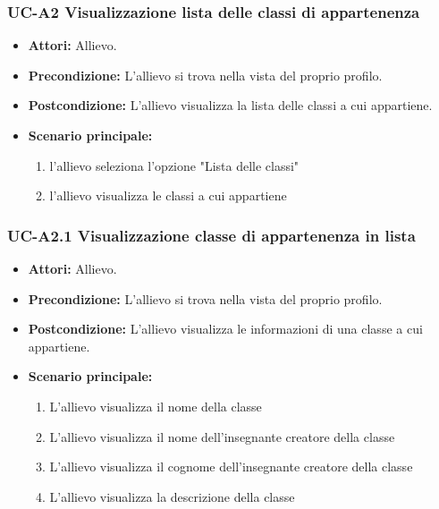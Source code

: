 	\subsubsection{UC-A2 Visualizzazione lista delle classi di appartenenza}
		\begin{itemize}
			\item \textbf{Attori:} Allievo.
			\item \textbf{Precondizione:} L'allievo si trova nella vista del proprio profilo.
			\item \textbf{Postcondizione:} L'allievo visualizza la lista delle classi a cui appartiene.
			\item \textbf{Scenario principale:}
			\begin{enumerate}
				\item l'allievo seleziona l'opzione "Lista delle classi"
				\item l'allievo visualizza le classi a cui appartiene
			\end{enumerate}
		\end{itemize}			

\subsubsection{UC-A2.1 Visualizzazione classe di appartenenza in lista}
		\begin{itemize}
			\item \textbf{Attori:} Allievo.
			\item \textbf{Precondizione:} L'allievo si trova nella vista del proprio profilo.
			\item \textbf{Postcondizione:} L'allievo visualizza le informazioni di una classe a cui appartiene.
			\item \textbf{Scenario principale:}
			\begin{enumerate}
				\item L'allievo visualizza il nome della classe
				\item L'allievo visualizza il nome dell'insegnante creatore della classe
				\item L'allievo visualizza il cognome dell'insegnante creatore della classe
				\item L'allievo visualizza la descrizione della classe
			\end{enumerate}
		\end{itemize}	

